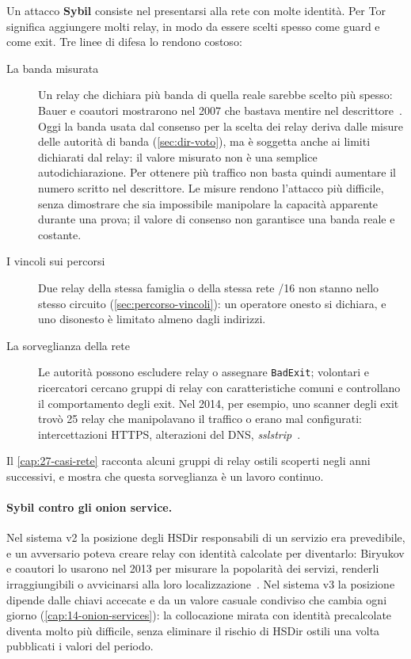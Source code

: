 Un attacco \textbf{Sybil} consiste nel presentarsi alla rete con molte identità. Per Tor significa aggiungere molti relay, in modo da essere scelti spesso come guard e come exit. Tre linee di difesa lo rendono costoso:
\begin{description}
  \item[La banda misurata] Un relay che dichiara più banda di quella reale sarebbe scelto più spesso: Bauer e coautori mostrarono nel 2007 che bastava mentire nel descrittore~\cite{bauer2007lowresource}. Oggi la banda usata dal consenso per la scelta dei relay deriva dalle misure delle autorità di banda (\cref{sec:dir-voto}), ma è soggetta anche ai limiti dichiarati dal relay: il valore misurato non è una semplice autodichiarazione. Per ottenere più traffico non basta quindi aumentare il numero scritto nel descrittore. Le misure rendono l'attacco più difficile, senza dimostrare che sia impossibile manipolare la capacità apparente durante una prova; il valore di consenso non garantisce una banda reale e costante.
  \item[I vincoli sui percorsi] Due relay della stessa famiglia o della stessa rete /16 non stanno nello stesso circuito (\cref{sec:percorso-vincoli}): un operatore onesto si dichiara, e uno disonesto è limitato almeno dagli indirizzi.
  \item[La sorveglianza della rete] Le autorità possono escludere relay o assegnare \texttt{BadExit}; volontari e ricercatori cercano gruppi di relay con caratteristiche comuni e controllano il comportamento degli exit. Nel 2014, per esempio, uno scanner degli exit trovò 25 relay che manipolavano il traffico o erano mal configurati: intercettazioni HTTPS, alterazioni del DNS, \emph{sslstrip}~\cite{winter2014spoiled}.
\end{description}
Il \cref{cap:27-casi-rete} racconta alcuni gruppi di relay ostili scoperti negli anni successivi, e mostra che questa sorveglianza è un lavoro continuo.

\paragraph{Sybil contro gli onion service.} Nel sistema v2 la posizione degli HSDir responsabili di un servizio era prevedibile, e un avversario poteva creare relay con identità calcolate per diventarlo: Biryukov e coautori lo usarono nel 2013 per misurare la popolarità dei servizi, renderli irraggiungibili o avvicinarsi alla loro localizzazione~\cite{biryukov2013trawling}. Nel sistema v3 la posizione dipende dalle chiavi accecate e da un valore casuale condiviso che cambia ogni giorno (\cref{cap:14-onion-services}): la collocazione mirata con identità precalcolate diventa molto più difficile, senza eliminare il rischio di HSDir ostili una volta pubblicati i valori del periodo.

